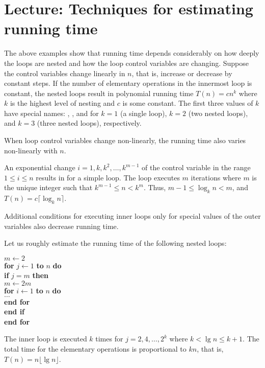 \chapter{Lecture: Techniques for estimating running time}


The above examples show that running time depends considerably on how
deeply the loops are nested and how the loop control variables are
changing. Suppose the control variables change linearly in $n$, that
is, increase or decrease by constant steps. If the number of elementary
operations in the innermost loop is constant, the nested loops result
in polynomial running time $T(n) = c  n^{k}$ where $k$ is
the highest level of nesting and $c$ is some constant. The first three
values of $k$ have special names: , 
,
and  for $k=1$ (a single loop), $k=2$ (two nested
loops), and $k=3$ (three nested loops), respectively.

When loop control variables change non-linearly,
the running time also varies non-linearly with $n$.

\begin{Example} 
An exponential change \(i=1,k,k^2 ,\ldots, k^{m-1}\) of
the control variable  in the
range \(1 \le i \le n\) results in 
for a simple loop. The loop executes $m$ 
iterations where $m$ is the unique integer such that $k^{m-1} \le  n  < k^{m}$. Thus, $m-1 \le \log_{k} n
< m$, and $T(n) = c  \lceil \log_{k} n \rceil$.
\end{Example}
 
Additional conditions for executing inner loops only for special values of 
the outer variables also decrease running time. 

\begin{Boxample}[6]
\label{exm:nest2}
Let us roughly estimate the running time of the following nested loops:
 
\hspace*{.3in}\begin{minipage}{5in}
\Algorbody
{
\(m \leftarrow 2\) \\
\textbf{for} \(j \leftarrow 1\) \textbf{to} \(n\) \textbf{do}\\
\>\textbf{if} \(j = m \) \textbf{then} \\
\>\> \(m \leftarrow 2m\) \\
\>\>\textbf{for} \(i \leftarrow  1\) \textbf{to} \(n\) \textbf{do}\\
\>\>\>$\ldots$  \\
\>\>\textbf{end for} \\
\>\textbf{end if}\\
\textbf{end for}\\
}
\end{minipage}

The inner loop is executed $k$ times for $j=2, 4, \ldots, 2^{k}$
where $k < \lg n \le k+1$. The total time for the elementary operations is 
proportional to $kn$, that is, $T(n)=  n  \lfloor \lg n \rfloor$.    
\end{Boxample}

